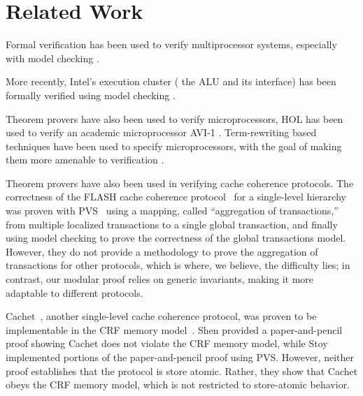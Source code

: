 \section{Related Work}
\label{relatedWork}

Formal verification has been used to verify multiprocessor
systems, especially with model checking
\cite{burch1994automatic,mcmillan1998verification}.

More recently, Intel's execution cluster (\ie{} the ALU and its
interface) has been formally verified using model checking
\cite{kaivola2009replacing}.

Theorem provers have also been used to verify microprocessors, \eg{} HOL has been
used to verify an academic microprocessor AVI-1 \cite{windley1995formal}.
Term-rewriting based techniques have been used to specify microprocessors, with
the goal of making them more amenable to verification \cite{shen1999using}.



Theorem provers have also been used in verifying cache coherence protocols.
The correctness of the FLASH cache coherence protocol~\cite{flash} for a
single-level hierarchy was proven with PVS~\cite{park} using a mapping, called
``aggregation of transactions,'' from multiple localized transactions to a
single global transaction, and finally using model checking to prove the correctness of
the global transactions model. However, they do not provide a methodology to
prove the aggregation of transactions for other protocols, which is where, we
believe, the difficulty lies; in contrast, our modular proof relies on generic
invariants, making it more adaptable to different protocols.

Cachet~\cite{StoyShenArvind:Proofs}, another single-level cache coherence
protocol, was proven to be implementable in the CRF memory
model~\cite{Shen:CRF}. Shen \etal{} provided a paper-and-pencil proof showing
Cachet does not violate the CRF memory model, while Stoy \etal{} implemented
portions of the paper-and-pencil proof using PVS. However, neither proof
establishes that the protocol is store atomic. Rather, they show that Cachet
obeys the CRF memory model, which is not restricted to store-atomic behavior.


